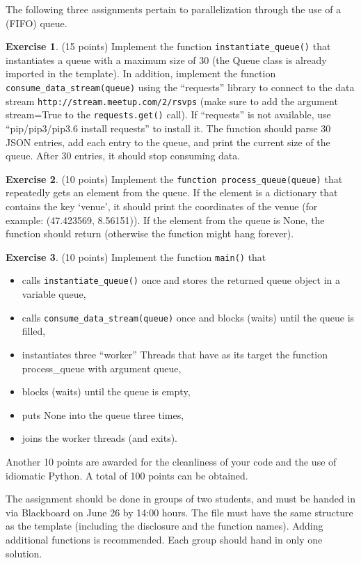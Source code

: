 \documentclass[a4paper]{report}
\theoremstyle{definition}
\newtheorem{exercise}{Exercise}
\begin{document}
The following three assignments pertain to parallelization through the
use of a (FIFO) queue.

\begin{exercise}
(15 points) Implement the function \texttt{\small instantiate\_queue()} that
instantiates a queue with a maximum size of 30 (the Queue class is
already imported in the template). In addition, implement the function
\texttt{\small consume\_data\_stream(queue)} using the “requests” library to connect to
the data stream \texttt{\small http://stream.meetup.com/2/rsvps} (make sure to add the
argument stream=True to the \texttt{\small requests.get()} call). If “requests” is
not available, use “pip/pip3/pip3.6 install requests” to install it.
The function should parse 30 JSON entries, add each entry to the queue,
and print the current size of the queue. After 30 entries, it should
stop consuming data.
\end{exercise}

\begin{exercise}
(10 points) Implement the \texttt{\small function process\_queue(queue)} that repeatedly
gets an element from the queue. If the element is a dictionary that
contains the key ‘venue’, it should print the coordinates of the
venue (for example: (47.423569, 8.56151)). If the element from the
queue is None, the function should return (otherwise the function might
hang forever).
\end{exercise}

\begin{exercise}
(10 points) Implement the function \texttt{\small main()} that

\begin{itemize}
\item calls \texttt{\small instantiate\_queue()} once and stores the returned queue object
in a variable queue,
\item calls \texttt{\small consume\_data\_stream(queue)} once and blocks (waits) until the
queue is filled,
\item instantiates three “worker” Threads that have as its target
the function process\_queue with argument queue,
\item blocks (waits) until the queue is empty,
\item puts None into the queue three times,
\item joins the worker threads (and exits).
\end{itemize}
\end{exercise}

Another 10 points are awarded for the cleanliness of your code and the
use of idiomatic Python. A total of 100 points can be obtained.

The assignment should be done in groups of two students, and must be
handed in via Blackboard on June 26 by 14:00 hours. The file must
have the same structure as the template (including the disclosure
and the function names). Adding additional functions is recommended.
Each group should hand in only one solution.
\end{document}
